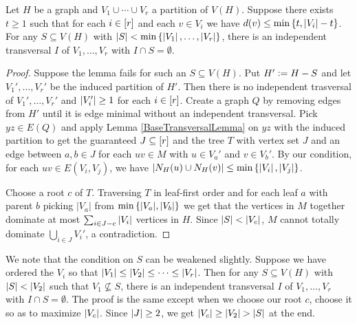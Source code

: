 \begin{lem}\label{SingletonSetTransversalLopsided}
Let $H$ be a graph and $V_1 \cup \cdots \cup V_r$ a partition of $V(H)$.  
Suppose there exists $t \geq 1$ such that for each $i \in \left[r\right]$ and each $v \in V_i$ we have $d(v) \leq \min\left\{ t, \left|V_i\right|-t \right\}$.  For any $S \subseteq V(H)$ with $\left|S\right| < \min\left\{ \left|V_1\right|, \ldots, \left|V_r\right| \right\}$, there is an independent transversal $I$ of $V_1, \ldots, V_r$ with $I \cap S = \emptyset$.
\end{lem}
\begin{proof}
Suppose the lemma fails for such an $S \subseteq V(H)$.  Put $H' \mathrel{\mathop:}= H - S$ and let $V_1', \ldots, V_r'$ be the induced partition of $H'$. Then there is no independent trasversal of $V_1', \ldots, V_r'$ and $\left|V_i'\right| \geq 1$ for each $i \in \left[r\right]$. Create a graph $Q$ by removing edges from $H'$ until it is edge minimal without an independent transversal. Pick $yz \in E(Q)$ and apply Lemma 
\ref{BaseTransversalLemma} on $yz$ with the induced partition to get the guaranteed 
$J \subseteq \left[r\right]$ and the tree $T$ with vertex set $J$ and an edge between $a, b \in
J$ for each $uv \in M$ with $u \in V_a'$ and $v \in V_b'$.  By our condition, for each $uv \in E(V_i, V_j)$, we have $\left|N_H(u) \cup N_H(v)\right| \leq \min\left\{ \left|V_i\right|, \left|V_j\right| \right\}$.

Choose a root $c$ of $T$. Traversing $T$ in leaf-first order and for each leaf $a$ with parent $b$ picking $|V_a|$ from $\min\left\{ |V_a|, |V_b| \right\}$ we get that the vertices in $M$ together dominate at most $\sum_{i \in J - c} \left|V_i\right|$ vertices in $H$.  Since $\left|S\right| < \left|V_c\right|$, $M$ cannot totally dominate $\bigcup_{i \in J} V_i'$, a contradiction.
\end{proof}

We note that the condition on $S$ can be weakened slightly.  Suppose we have ordered the $V_i$ so that $\left|V_1\right| \leq \left|V_2\right| \leq \cdots \leq \left|V_r\right|$.  Then for any $S \subseteq V(H)$ with $\left|S\right| < \left|V_2\right|$ such that $V_1 \not \subseteq S$, there is an independent transversal $I$ of $V_1, \ldots, V_r$ with $I \cap S = \emptyset$.  The proof is the same except when we choose our root $c$, choose it so as to maximize $\left|V_c\right|$.  Since $\left|J\right| \geq 2$, we get $\left|V_c\right| \geq \left|V_2\right| > \left|S\right|$ at the end.

